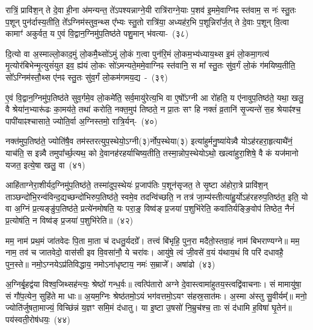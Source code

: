 रात्रिं॒ प्रावि॑श॒न् ते दे॒वा ही॒ना अ॑मन्यन्त॒ ते॑\-ऽपश्यन्नाग्ने॒यी रात्रि॑राग्ने॒याः प॒शव॑ इ॒ममे॒वाग्निꣴ स्त॑वाम॒ स नः॑ स्तु॒तः प॒शून् पुन॑र्दास्य॒तीति॒ ते᳚\-ऽग्निम॑स्तुव॒न्थ्स ए᳚भ्यः स्तु॒तो रात्रि॑या॒ अध्यह॑र॒भि प॒शून्निरा᳚र्ज॒त् ते दे॒वाः प॒शून् वि॒त्वा कामाꣳ॑ अकुर्वत॒ य ए॒वं वि॒द्वान॒ग्निमु॑प॒तिष्ठ॑ते पशु॒मान् भ॑वत्या-~(३८)\ip

दि॒त्यो वा अ॒स्माल्लो॒काद॒मुं लो॒कमै॒थ्सो॑\-ऽमुं लो॒कं ग॒त्वा पुन॑रि॒मं लो॒कम॒भ्य॑ध्याय॒थ्स इ॒मं लो॒कमा॒गत्य॑ मृ॒त्योर॑बिभेन्मृ॒त्युसं॑युत इव॒ ह्य॑यं लो॒कः सो॑\-ऽमन्यते॒ममे॒वाग्निꣴ स्त॑वानि॒ स मा᳚ स्तु॒तः सु॑व॒र्गं लो॒कं ग॑मयिष्य॒तीति॒ सो᳚\-ऽग्निम॑स्तौ॒थ्स ए॑नꣴ स्तु॒तः सु॑व॒र्गं लो॒कम॑गमय॒द्य~-~(३९)\ip

ए॒वं वि॒द्वान॒ग्निमु॑प॒तिष्ठ॑ते सुव॒र्गमे॒व लो॒कमे॑ति॒ सर्व॒मायु॑रेत्य॒भि वा ए॒षो᳚\-ऽग्नी आ रो॑हति॒ य ए॑नावुप॒तिष्ठ॑ते॒ यथा॒ खलु॒ वै श्रेया॑न॒भ्यारू॑ढः का॒मय॑ते॒ तथा॑ करोति॒ नक्त॒मुप॑ तिष्ठते॒ न प्रा॒तः सꣳ हि नक्तं॑ व्र॒तानि॑ सृ॒ज्यन्ते॑ स॒ह श्रेयाꣴ॑श्च॒ पापी॑याꣴश्चासाते॒ ज्योति॒र्वा अ॒ग्निस्तमो॒ रात्रि॒र्यन्-~(४०)\ip

नक्त॑मुप॒तिष्ठ॑ते॒ ज्योति॑षै॒व तम॑स्तरत्युप॒स्थेयो॒\-ऽग्नी(३)र्नोप॒\-स्थेया(३) इत्या॑हुर्मनु॒ष्या॑येन्न्वै यो\-ऽह॑रहरा॒हृत्या\-थै॑नं॒ याच॑ति॒ स इन्न्वै तमुपा᳚र्च्छ॒त्यथ॒ को दे॒वानह॑रहर्याचिष्य॒तीति॒ तस्मा॒न्नोप॒स्थेयो\-ऽथो॒ खल्वा॑हुरा॒शिषे॒ वै कं यज॑मानो यजत॒ इत्ये॒षा खलु॒ वा~(४१)\ip

आहि॑ताग्नेरा॒शीर्यद॒ग्नि\-मु॑प॒तिष्ठ॑ते॒ तस्मा॑दुप॒स्थेयः॑ प्र॒जा\-प॑तिः प॒शून॑सृजत॒ ते सृ॒ष्टा अ॑होरा॒त्रे प्रावि॑श॒न् ताञ्छन्दो॑\-भि॒रन्व॑\-विन्द॒द्यच्छन्दो॑भि\-रुप॒तिष्ठ॑ते॒ स्वमे॒व तदन्वि॑च्छति॒ न तत्र॑ जा॒म्य॑स्तीत्या॑हु॒र्यो\-ऽह॑रहरुप॒तिष्ठ॑त॒ इति॒ यो वा अ॒ग्निं प्र॒त्यङ्ङु॑प॒तिष्ठ॑ते॒ प्रत्ये॑नमोषति॒ यः परा॒ङ्॒ विष्व॑ङ् प्र॒जया॑ प॒शुभि॑रेति॒ कवा॑तिर्यङ्ङि॒वोप॑ तिष्ठेत॒ नैनं॑ प्र॒त्योष॑ति॒ न विष्व॑ङ् प्र॒जया॑ प॒शुभि॑रेति॥~(४२)\ip

{\anuvakamend[{सि॒क्तस्य॑ स॒ह भ॑वति॒ यो यत्खलु॒ वै प॒शुभि॒स्त्रयो॑दश च}]}

मम॒ नाम॑ प्रथ॒मं जा॑तवेदः पि॒ता मा॒ता च॑ दधतु॒र्यदग्रे᳚। तत्त्वं बि॑भृहि॒ पुन॒रा मदैतो॒स्तवा॒हं नाम॑ बिभराण्यग्ने॥ मम॒ नाम॒ तव॑ च जातवेदो॒ वास॑सी इव वि॒वसा॑नौ॒ ये चरा॑वः। आयु॑षे॒ त्वं जी॒वसे॑ व॒यं य॑थाय॒थं वि परि॑ दधावहै॒ पुन॒स्ते॥ नमो॒\-ऽग्नये\-ऽप्र॑तिविद्धाय॒ नमो\-ऽना॑धृष्टाय॒ नमः॑ स॒म्राजे᳚। अषा॑ढो~(४३)\ip

अ॒ग्निर्बृ॒हद्व॑या विश्व॒जिथ्सह॑न्त्यः॒ श्रेष्ठो॑ गन्ध॒र्वः॥ त्वत्पि॑तारो अग्ने दे॒वास्त्वामा॑\-हुतय॒स्त्वद्वि॑वाचनाः। सं मामायु॑षा॒ सं गौ॑प॒त्येन॒ सुहि॑ते मा धाः॥ अ॒यम॒ग्निः श्रेष्ठ॑तमो॒\-ऽयं भग॑वत्तमो॒\-ऽयꣳ स॑हस्र॒सात॑मः। अ॒स्मा अ॑स्तु सु॒वीर्यम्᳚॥ मनो॒ ज्योति॑र्जुषता॒माज्यं॒ विच्छि॑न्नं य॒ज्ञꣳ समि॒मं द॑धातु। या इ॒ष्टा उ॒षसो॑ नि॒म्रुच॑श्च॒ ताः सं द॑धामि ह॒विषा॑ घृ॒तेन॑॥ पय॑स्वती॒रोष॑धयः॒~(४४)\ip

